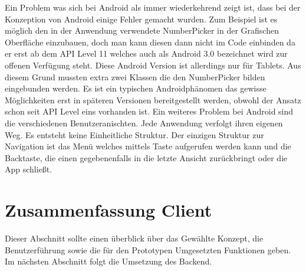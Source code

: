 Ein Problem was sich bei Android als immer wiederkehrend zeigt ist, dass bei der Konzeption von Android einige Fehler gemacht wurden. Zum Beispiel ist es möglich den in der Anwendung verwendete NumberPicker in der Grafischen Oberfläche einzubauen, doch man kann diesen dann nicht im Code einbinden da er erst ab dem API Level 11 welches auch als Android 3.0 bezeichnet wird zur offenen Verfügung steht. Diese Android Version ist allerdings nur für Tablets. Aus diesem Grund mussten extra zwei Klassen die den NumberPicker bilden eingebunden werden. Es ist ein typischen Androidphänomen das gewisse Möglichkeiten erst in späteren Versionen bereitgestellt werden, obwohl der Ansatz schon seit API Level eins vorhanden ist. Ein weiteres Problem bei Android sind die verschiedenen Benutzeranischten. Jede Anwendung verfolgt ihren eigenen Weg. Es entsteht keine Einheitliche Struktur. Der einzigen Struktur zur Navigation ist das Menü welches mittels Taste aufgerufen werden kann und die Backtaste, die einen gegebenenfalls in die letzte Ansicht zurückbringt oder die App schließt.  


\section{Zusammenfassung Client}

Dieser Abschnitt sollte einen überblick über das Gewählte Konzept, die Benutzerführung sowie die für den Prototypen Umgesetzten Funktionen geben. Im nächsten Abschnitt folgt die Umsetzung des Backend.  


